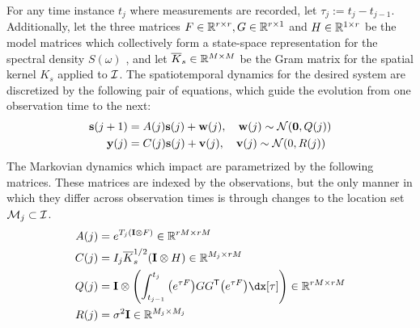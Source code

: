 \documentclass[10pt]{article}
\begin{document}
For any time instance $t_{j}$ where measurements are recorded, let $\tau_{j} := t_{j} - t_{j-1}$. Additionally, let the three matrices $F \in \mathbb{R}^{r \times r}, G \in \mathbb{R}^{r \times 1}$ and $H \in \mathbb{R}^{1 \times r}$ be the model matrices which collectively form a state-space representation for the spectral density $S(\omega)$ \citep{Carron-ML-Kalman-2016,Bayesian-Filter-Book-2023}, and let $\overline{K}_{s} \in \mathbb{R}^{M \times M}$ be the Gram matrix for the spatial kernel $K_{s}$ applied to $\mathcal{I}$. The spatiotemporal dynamics for the desired system are discretized by the following pair of equations, which guide the evolution from one observation time to the next:
\begin{subequations}
    \label{eq:todescato-discrete-evolution}
    \begin{align}
        \mathbf{s}(j+1) &= A(j)\mathbf{s}(j) + \mathbf{w}(j), \quad \mathbf{w}(j) \sim \mathcal{N}(\mathbf{0}, Q(j)) \label{eq:todescato-discretized-state}\\
        \mathbf{y}(j) &= C(j)\mathbf{s}(j) + \mathbf{v}(j), \quad \mathbf{v}(j) \sim \mathcal{N}(0, R(j)) \label{eq:todescato-discretized-measure}
    \end{align}
\end{subequations}
The Markovian dynamics which impact  are parametrized by the following matrices. These matrices are indexed by the observations, but the only manner in which they differ across observation times is through changes to the location set $\mathcal{M}_{j} \subset \mathcal{I}$. 
\begin{subequations}
    \label{eq:todescato-discretize-parameters}
    \begin{align}
        A(j) &= e^{T_{j}(\bfI \otimes F)} \in \bbR^{rM \times rM} \label{eq:todescato-discretize-Aj}\\
        C(j) &= I_{j}\overline{K}_{s}^{1/2}(\bfI \otimes H) \in \bbR^{M_{j} \times rM} \label{eq:todescato-discretize-Cj}\\
        Q(j) &= \bfI \otimes \left(\int_{t_{j-1}}^{t_{j}}\big(e^{\tau{F}}\big)GG^{\sfTsmall}\big(e^{\tau{F}}\big)\dx[\tau]\right) \in \bbR^{rM \times rM} \label{eq:todescato-discretize-Qj}\\
        R(j) &= \sigma^{2}\bfI \in \bbR^{M_{j} \times M_{j}} \label{eq:todescato-discretize-Rj}
    \end{align}
\end{subequations}
\end{document}
